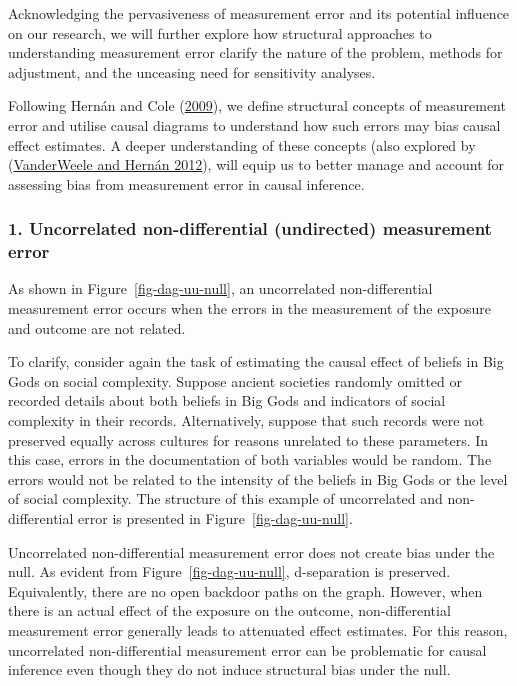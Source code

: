 \documentclass[
  singlecolumn]{article}
\begin{document}
Acknowledging the pervasiveness of measurement error and its potential
influence on our research, we will further explore how structural
approaches to understanding measurement error clarify the nature of the
problem, methods for adjustment, and the unceasing need for sensitivity
analyses.

Following Hernán and Cole (\protect\hyperlink{ref-hernuxe1n2009}{2009}),
we define structural concepts of measurement error and utilise causal
diagrams to understand how such errors may bias causal effect estimates.
A deeper understanding of these concepts (also explored by
(\protect\hyperlink{ref-vanderweele2012}{VanderWeele and Hernán 2012}),
will equip us to better manage and account for assessing bias from
measurement error in causal inference.

\hypertarget{uncorrelated-non-differential-undirected-measurement-error}{%
\subsubsection{1. Uncorrelated non-differential (undirected) measurement
error}\label{uncorrelated-non-differential-undirected-measurement-error}}

As shown in Figure~\ref{fig-dag-uu-null}, an uncorrelated
non-differential measurement error occurs when the errors in the
measurement of the exposure and outcome are not related.

To clarify, consider again the task of estimating the causal effect of
beliefs in Big Gods on social complexity. Suppose ancient societies
randomly omitted or recorded details about both beliefs in Big Gods and
indicators of social complexity in their records. Alternatively, suppose
that such records were not preserved equally across cultures for reasons
unrelated to these parameters. In this case, errors in the documentation
of both variables would be random. The errors would not be related to
the intensity of the beliefs in Big Gods or the level of social
complexity. The structure of this example of uncorrelated and
non-differential error is presented in Figure~\ref{fig-dag-uu-null}.

Uncorrelated non-differential measurement error does not create bias
under the null. As evident from Figure~\ref{fig-dag-uu-null},
d-separation is preserved. Equivalently, there are no open backdoor
paths on the graph. However, when there is an actual effect of the
exposure on the outcome, non-differential measurement error generally
leads to attenuated effect estimates. For this reason, uncorrelated
non-differential measurement error can be problematic for causal
inference even though they do not induce structural bias under the null.
\end{document}
